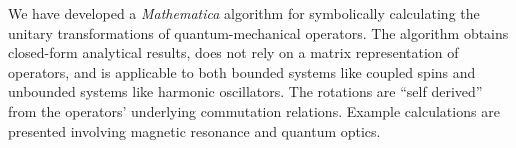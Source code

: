 
We have developed a \emph{Mathematica} algorithm for symbolically calculating the unitary transformations of quantum-mechanical operators.  The algorithm obtains closed-form analytical results, does not rely on a matrix representation of operators, and is applicable to both bounded systems like coupled spins and unbounded systems like harmonic oscillators.  The rotations are ``self derived'' from the operators' underlying commutation relations.  Example calculations are presented involving magnetic resonance and quantum optics.  